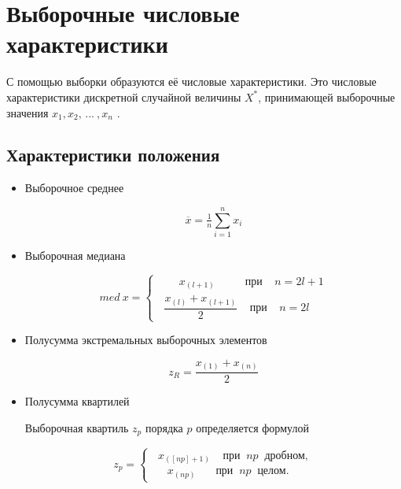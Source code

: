 \documentclass{article}
\begin{document}
\section{Выборочные числовые характеристики}

С помощью выборки образуются её числовые характеристики. Это числовые характеристики дискретной случайной величины $X^*$, принимающей выборочные значения $x_1, x_2, \, ... \: , x_n$ \cite[с. 411]{b:probSectMath}.

\subsection{Характеристики положения}

\begin{itemize}
  \item Выборочное среднее
  
  \begin{equation} \label{eq:mean}
    \overline{x} = \tfrac{1}{n}\sum\limits_{i=1}^n x_i
  \end{equation}
  
  \item Выборочная медиана
  
  \begin{equation} \label{eq:med}
    med \: x = 
    \begin{cases} 
        \;\;\;\;\;\;\; x_{(l+1)} \:\;\;\;\;\;\;\;\;\; \text{при} \;\;\;\; n = 2l + 1\\
        \;\; \dfrac{x_{(l)} + x_{(l+1)}}{2} \;\;\;\; \text{при} \;\;\;\; n = 2l
    \end{cases}
  \end{equation}
  
  \item Полусумма экстремальных выборочных элементов
  
  \begin{equation} \label{eq:zR}
    z_R = \dfrac{x_{(1)} + x_{(n)}}{2}
  \end{equation}
  
  \item Полусумма квартилей
  
  Выборочная квартиль $z_p$ порядка $p$ определяется формулой
  
   \begin{equation}
    z_p =
    \begin{cases}
        \;\; x_{([np]+1)} \;\;\;\; \text{при} \;\; np \;\; \text{дробном},\\
        \;\;\;\;\; x_{(np)} \,\:\;\;\;\;\; \text{при} \;\; np \;\; \text{целом}.
    \end{cases}
  \end{equation}
  

\end{itemize}
\end{document}
